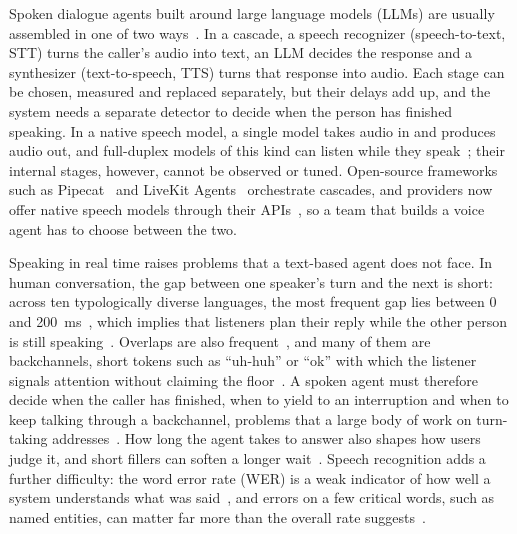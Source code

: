\documentclass[11pt]{article}
\begin{document}
Spoken dialogue agents built around large language models (LLMs) are usually assembled in one of two ways~\cite{arora2025survey}.
In a cascade, a speech recognizer (speech-to-text, STT) turns the caller's audio into text, an LLM decides the response and a synthesizer (text-to-speech, TTS) turns that response into audio.
Each stage can be chosen, measured and replaced separately, but their delays add up, and the system needs a separate detector to decide when the person has finished speaking.
In a native speech model, a single model takes audio in and produces audio out, and full-duplex models of this kind can listen while they speak~\cite{nguyen2023dgslm,zhang2023speechgpt,defossez2024moshi}; their internal stages, however, cannot be observed or tuned.
Open-source frameworks such as Pipecat~\cite{pipecat} and LiveKit Agents~\cite{livekitagents} orchestrate cascades, and providers now offer native speech models through their APIs~\cite{gptlive}, so a team that builds a voice agent has to choose between the two.

Speaking in real time raises problems that a text-based agent does not face.
In human conversation, the gap between one speaker's turn and the next is short: across ten typologically diverse languages, the most frequent gap lies between 0 and 200~ms~\cite{stivers2009}, which implies that listeners plan their reply while the other person is still speaking~\cite{levinson2015}.
Overlaps are also frequent~\cite{heldner2010}, and many of them are backchannels, short tokens such as ``uh-huh'' or ``ok'' with which the listener signals attention without claiming the floor~\cite{yngve1970,ward2000}.
A spoken agent must therefore decide when the caller has finished, when to yield to an interruption and when to keep talking through a backchannel, problems that a large body of work on turn-taking addresses~\cite{skantze2021,ekstedt2020turngpt,ekstedt2022vap}.
How long the agent takes to answer also shapes how users judge it, and short fillers can soften a longer wait~\cite{shiwa2009,maslych2025}.
Speech recognition adds a further difficulty: the word error rate (WER) is a weak indicator of how well a system understands what was said~\cite{wang2003wer,morris2004}, and errors on a few critical words, such as named entities, can matter far more than the overall rate suggests~\cite{benjannet2015}.
\end{document}
